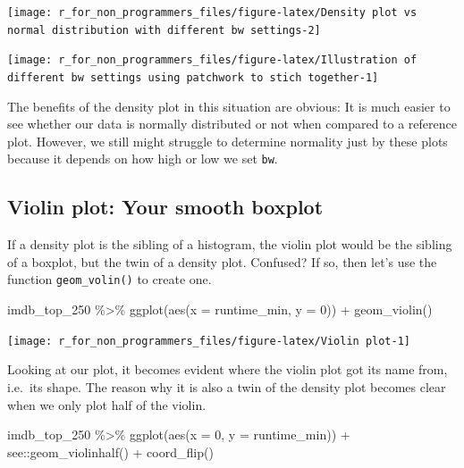 \documentclass[
]{book}
\newenvironment{Shaded}{\begin{snugshade}}{\end{snugshade}}
\newcommand{\AttributeTok}[1]{\textcolor[rgb]{0.77,0.63,0.00}{#1}}
\newcommand{\DecValTok}[1]{\textcolor[rgb]{0.00,0.00,0.81}{#1}}
\newcommand{\FunctionTok}[1]{\textcolor[rgb]{0.00,0.00,0.00}{#1}}
\newcommand{\NormalTok}[1]{#1}
\newcommand{\SpecialCharTok}[1]{\textcolor[rgb]{0.00,0.00,0.00}{#1}}
\begin{document}
\begin{center}\texttt{[image: r\_for\_non\_programmers\_files/figure-latex/Density plot vs normal distribution with different bw settings-2]} \end{center}

\begin{center}\texttt{[image: r\_for\_non\_programmers\_files/figure-latex/Illustration of different bw settings using patchwork to stich together-1]} \end{center}

The benefits of the density plot in this situation are obvious: It is much easier to see whether our data is normally distributed or not when compared to a reference plot. However, we still might struggle to determine normality just by these plots because it depends on how high or low we set \texttt{bw}.

\hypertarget{violin-plot-your-smooth-boxplot}{%
\subsection{Violin plot: Your smooth boxplot}\label{violin-plot-your-smooth-boxplot}}

If a density plot is the sibling of a histogram, the violin plot would be the sibling of a boxplot, but the twin of a density plot. Confused? If so, then let's use the function \texttt{geom\_volin()} to create one.

\begin{Shaded}
\begin{Highlighting}[]
\NormalTok{imdb\_top\_250 }\SpecialCharTok{\%\textgreater{}\%}
  \FunctionTok{ggplot}\NormalTok{(}\FunctionTok{aes}\NormalTok{(}\AttributeTok{x =}\NormalTok{ runtime\_min, }\AttributeTok{y =} \DecValTok{0}\NormalTok{)) }\SpecialCharTok{+}
  \FunctionTok{geom\_violin}\NormalTok{()}
\end{Highlighting}
\end{Shaded}

\begin{center}\texttt{[image: r\_for\_non\_programmers\_files/figure-latex/Violin plot-1]} \end{center}

Looking at our plot, it becomes evident where the violin plot got its name from, i.e.~its shape. The reason why it is also a twin of the density plot becomes clear when we only plot half of the violin.

\begin{Shaded}
\begin{Highlighting}[]
\NormalTok{imdb\_top\_250 }\SpecialCharTok{\%\textgreater{}\%}
  \FunctionTok{ggplot}\NormalTok{(}\FunctionTok{aes}\NormalTok{(}\AttributeTok{x =} \DecValTok{0}\NormalTok{, }\AttributeTok{y =}\NormalTok{ runtime\_min)) }\SpecialCharTok{+}
\NormalTok{  see}\SpecialCharTok{::}\FunctionTok{geom\_violinhalf}\NormalTok{() }\SpecialCharTok{+}
  \FunctionTok{coord\_flip}\NormalTok{()}
\end{Highlighting}
\end{Shaded}
\end{document}
